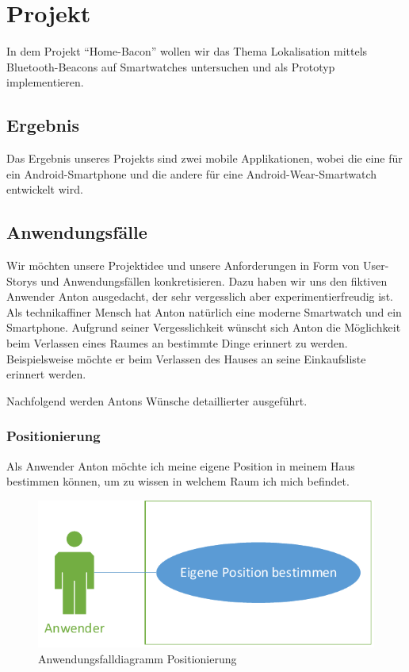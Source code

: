 \section{Projekt}

In dem Projekt "`Home-Bacon"' wollen wir das Thema Lokalisation mittels Bluetooth-Beacons auf Smartwatches untersuchen und als Prototyp implementieren.

\subsection{Ergebnis}
Das Ergebnis unseres Projekts sind zwei mobile Applikationen, wobei die eine für ein Android-Smartphone und die andere für eine Android-Wear-Smartwatch entwickelt wird.

\subsection{Anwendungsfälle}
\label{sec:useCases}
Wir möchten unsere Projektidee und unsere Anforderungen in Form von User-Storys und Anwendungsfällen konkretisieren. Dazu haben wir uns den fiktiven Anwender Anton ausgedacht, der sehr vergesslich aber experimentierfreudig ist. Als technikaffiner Mensch hat Anton natürlich eine moderne Smartwatch und ein Smartphone. Aufgrund seiner Vergesslichkeit wünscht sich Anton die Möglichkeit beim Verlassen eines Raumes an bestimmte Dinge erinnert zu werden. Beispielsweise möchte er beim Verlassen des Hauses an seine Einkaufsliste erinnert werden.

Nachfolgend werden Antons Wünsche detaillierter ausgeführt.

\subsubsection{Positionierung}
Als Anwender Anton möchte ich meine eigene Position in meinem Haus bestimmen können, um zu wissen in welchem Raum ich mich befindet. 

\begin{figure}[H]
\centering
\includegraphics[width=0.7\linewidth]{Bilder/UseCase-Position}
\caption{Anwendungsfalldiagramm Positionierung}
\label{fig:UseCase-Position}
\end{figure}

